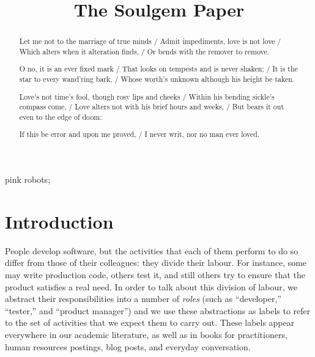 \documentclass[10pt, conference, compsocconf]{IEEEtran}
\begin{document}
\title{The Soulgem Paper}

\author{
}

\maketitle


\begin{abstract}

Let me not to the marriage of true minds / Admit impediments, love is not love / Which alters when it alteration finds, / Or bends with the remover to remove.

O no, it is an ever fixed mark / That looks on tempests and is never shaken; / It is the star to every wand'ring bark, / Whose worth's unknown although his height be taken.

Love's not time's fool, though rosy lips and cheeks / Within his bending sickle's compass come, / Love alters not with his brief hours and weeks, / But bears it out even to the edge of doom:

If this be error and upon me proved, / I never writ, nor no man ever loved.
\end{abstract}

\begin{IEEEkeywords}
pink robots;
\end{IEEEkeywords}


\section{Introduction}

People develop software, but the activities that each of them perform to do so differ from those of their colleagues: they divide their labour. For instance, some may write production code, others test it, and still others try to ensure that the product satisfies a real need. In order to talk about this division of labour, we abstract their responsibilities into a number of \emph{roles} (such as ``developer,'' ``tester,'' and ``product manager'') and we use these abstractions as labels to refer to the set of activities that we expect them to carry out. These labels appear everywhere in our academic literature, as well as in books for practitioners, human resources postings, blog posts, and everyday conversation.
\end{document}
